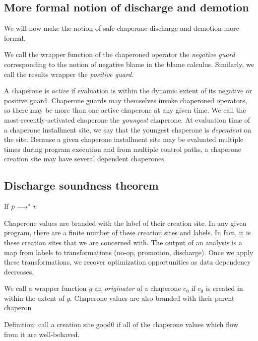 \documentclass{sigplanconf}
\begin{document}
\subsection{More formal notion of discharge and demotion}

We will now make the notion of safe chaperone discharge and demotion more formal.

We call the wrapper function of the chaperoned operator the \emph{negative guard} corresponding to the notion of negative blame in the blame calculus.
Similarly, we call the results wrapper the \emph{positive guard}.

A chaperone is \emph{active} if evaluation is within the dynamic extent of its negative or positive guard.
Chaperone guards may themselves invoke chaperoned operators, so there may be more than one active chaperone at any given time.
We call the most-recently-activated chaperone the \emph{youngest} chaperone.
At evaluation time of a chaperone installment site, we say that the youngest chaperone is \emph{dependent} on the site.
Because a given chaperone installment site may be evaluated multiple times during program execution and from multiple control paths, a chaperone creation site may have several dependent chaperones.

\subsection{Discharge soundness theorem}


If $p\longrightarrow^{*} v$ 

Chaperone values are branded with the label of their creation site. In any given program, there are a finite number of these creation sites and labels. In fact, it is these creation sites that we are concerned with. The output of an analysis is a map from labels to transformations (no-op, promotion, discharge). Once we apply these transformations, we recover optimization opportunities as data dependency decreases.

We call a wrapper function $g$ an \emph{originator} of a chaperone $c_0$ if $c_0$ is created in within the extent of $g$. Chaperone values are also branded with their parent chaperon

Definition: call a creation site good0 if all of the chaperone values which flow from it are well-behaved.

\end{document}
